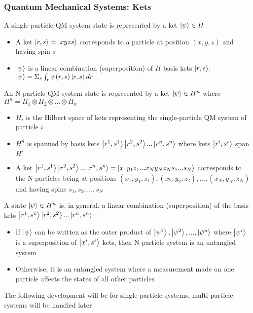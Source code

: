 \documentclass[8pt,t,mathserif,aspectratio=169]{beamer}
\begin{document}
\begin{frame}
  \frametitle{Quantum Mechanical Systems: Kets}
  \vspace{1mm}
  A single-particle QM system state is represented by a ket $\ket{\psi} \in H$
  \begin{itemize}
    \item A ket $\ket{r,s} = \ket{x y z s}$ corresponds to a particle at position $(x,y,z)$ and having spin $s$
    \item $\ket{\psi}$ is a linear combination (superposition) of $H$ basis kets $\ket{r,s}$: $\ket{\psi} = \Sigma_s \int_r \psi(r,s) \ket{r,s} dr$
  \end{itemize}
  An N-particle QM system state is represented by a ket $\ket{\psi} \in H^n$ where $H^n = H_1 \otimes H_2 \otimes ... \otimes H_n$
  \begin{itemize}
    \item $H_i$ is the Hilbert space of kets representing the single-particle QM system of particle $i$
    \item $H^n$ is spanned by basis kets $\ket{r^1,s^1} \ket{r^2,s^2} ... \ket{r^n,s^n}$ where kets $\ket{r^i,s^i}$ span $H^i$
    \item A ket $\ket{r^1,s^1} \ket{r^2,s^2} ... \ket{r^n,s^n} = \ket{x_1 y_1 z_1 ... x_N y_N z_N s_1 ... s_N}$ corresponds to the N particles being at positions $(x_1,y_1,z_1), (x_2,y_2,z_2), ..., (x_N,y_N,z_N)$ and having spins $s_1,s_2,...,s_N$
  \end{itemize}
  A state $\ket{\psi} \in H^n$ is, in general, a linear combination (superposition) of the basis kets $\ket{r^1,s^1} \ket{r^2,s^2} ... \ket{r^n,s^n}$
  \begin{itemize}
    \item If $\ket{\psi}$ can be written as the outer product of $\ket{\psi^1}, \ket{\psi^2}, ..., \ket{\psi^n}$ where $\ket{\psi^i}$ is a superposition of $\ket{x^i,s^i}$ kets, then N-particle system is an untangled system 
    \item Otherwise, it is an entangled system where a measurement made on one particle affects the states of all other particles 
  \end{itemize}
  The following development will be for single particle systems, multi-particle systems will be handled later
\end{frame}
\end{document}
